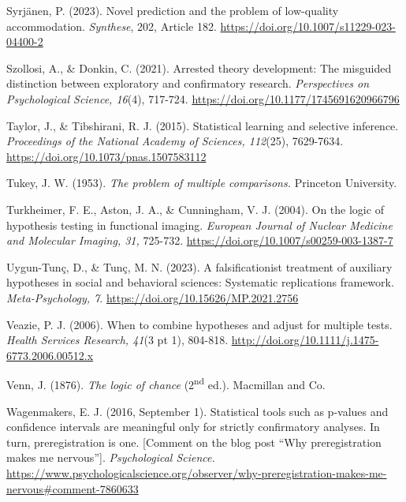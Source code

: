 \documentclass[authordate, meta]{jote-new-article}
\begin{document}
	Syrjänen, P. (2023). Novel prediction and the problem of low-quality accommodation. \emph{Synthese}, 202, Article 182. \url{https://doi.org/10.1007/s11229-023-04400-2}



	Szollosi, A., \& Donkin, C. (2021). Arrested theory development: The misguided distinction between exploratory and confirmatory research. \emph{Perspectives on Psychological Science, 16}(4), 717-724. \url{https://doi.org/10.1177/1745691620966796}



	Taylor, J., \& Tibshirani, R. J. (2015). Statistical learning and selective inference. \emph{Proceedings of the National Academy of Sciences, 112}(25), 7629-7634. \url{https://doi.org/10.1073/pnas.1507583112}



	Tukey, J. W. (1953). \emph{The problem of multiple comparisons.} Princeton University.



	Turkheimer, F. E., Aston, J. A., \& Cunningham, V. J. (2004). On the logic of hypothesis testing in functional imaging. \emph{European Journal of Nuclear Medicine and Molecular Imaging, 31, }725-732. \url{https://doi.org/10.1007/s00259-003-1387-7}



	Uygun-Tunç, D., \& Tunç, M. N. (2023). A falsificationist treatment of auxiliary hypotheses in social and behavioral sciences: Systematic replications framework. \emph{Meta-Psychology, 7}. \url{https://doi.org/10.15626/MP.2021.2756}



	Veazie, P. J. (2006). When to combine hypotheses and adjust for multiple tests. \emph{Health Services Research, 41}(3 pt 1), 804-818. \url{http://doi.org/10.1111/j.1475-6773.2006.00512.x}



	Venn, J. (1876). \emph{The logic of chance} (2\textsuperscript{nd} ed.). Macmillan and Co.



	Wagenmakers, E. J. (2016, September 1). Statistical tools such as p-values and confidence intervals are meaningful only for strictly confirmatory analyses. In turn, preregistration is one. [Comment on the blog post “Why preregistration makes me nervous”]. \emph{Psychological Science.} \url{https://www.psychologicalscience.org/observer/why-preregistration-makes-me-nervous\#comment-7860633}
\end{document}
